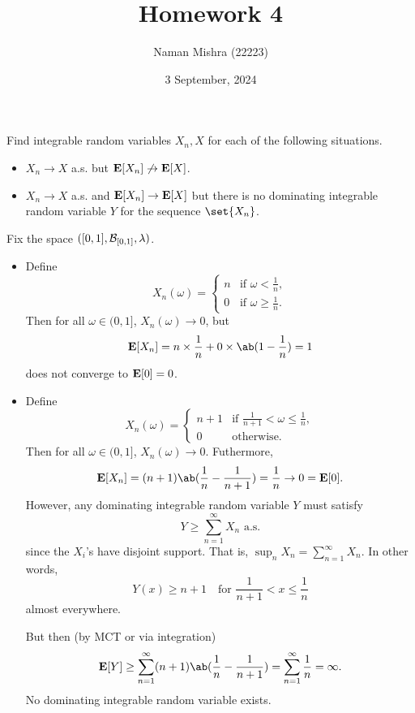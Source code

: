 \documentclass[12pt]{article}
\title{Homework 4}
\author{Naman Mishra (22223)}
\date{3 September, 2024}
\begin{document}
\maketitle

\begin{problem*}
    Find integrable random variables $X_n, X$ for each of the following
    situations.
    \begin{itemize}
        \item $X_n \to X$ a.s. but $\operatorname{\mathbf E}[X_n] \not\to \operatorname{\mathbf E}[X]$.
        \item $X_n \to X$ a.s. and $\operatorname{\mathbf E}[X_n] \to \operatorname{\mathbf E}[X]$ but there is no
        dominating integrable random variable $Y$ for the sequence
        $\set{X_n}$.
    \end{itemize}
\end{problem*}
\begin{solution}
    Fix the space $([0, 1], \mathcal B_{[0, 1]}, \lambda)$.
    \begin{itemize}
        \item Define \[
            X_n(\omega) = \begin{cases}
                n & \text{if } \omega < \frac1n, \\
                0 & \text{if } \omega \ge \frac1n.
            \end{cases}
        \] Then for all $\omega \in (0, 1]$, $X_n(\omega) \to 0$, but \[
            \E[X_n] = n \times \frac1n + 0 \times \ab(1 - \frac1n) = 1
        \] does not converge to $\operatorname{\mathbf E}[0] = 0$.
        \item Define \[
            X_n(\omega) = \begin{cases}
                n+1 & \text{if } \frac1{n+1} < \omega \le \frac1n, \\
                0 & \text{otherwise}.
            \end{cases}
        \] Then for all $\omega \in (0, 1]$, $X_n(\omega) \to 0$.
        Futhermore, \[
            \E[X_n] = (n+1) \ab(\frac1n - \frac1{n+1})
                = \frac1n \to 0
                = \E[0].
        \] However, any dominating integrable random variable $Y$ must
        satisfy \[
            Y \ge \sum_{n=1}^\infty X_n \text{ a.s.}
        \] since the $X_i$'s have disjoint support.
        That is, $\sup_n X_n = \sum_{n=1}^\infty X_n$.
        In other words, \[
            Y(x) \ge n + 1 \quad \text{for } \frac1{n+1} < x \le \frac1n
        \] almost everywhere.

        But then (by MCT or via integration) \[
            \E[Y] \ge \sum_{n=1}^\infty (n+1) \ab(\frac1n - \frac1{n+1})
                = \sum_{n=1}^\infty \frac1n
                = \infty.
        \] No dominating integrable random variable exists. \qedhere
    \end{itemize}
\end{solution}
\end{document}
